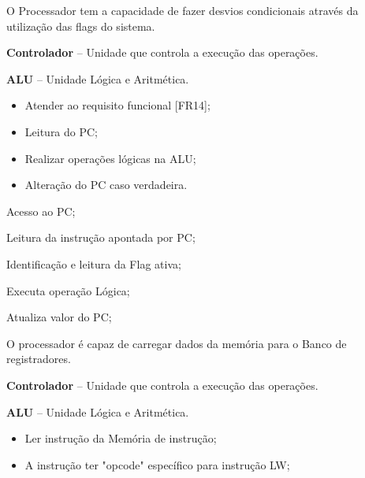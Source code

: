 \documentclass{article}
\begin{document}
  O Processador tem a capacidade de fazer desvios condicionais atrav\'{e}s da utilização das flags do sistema.
  \actors
    \begin{description}
     \item \textbf{Controlador} – Unidade que controla a execução das operações.
     \item \textbf{ALU} – Unidade L\'{o}gica e Aritm\'{e}tica.
    \end{description}
    
  \preconditions 
    \begin{itemize}
     \item Atender ao requisito funcional [FR14];
     \item Leitura do PC;
     \item Realizar operações lógicas na ALU;
    \end{itemize}

  \postconditions
    \begin{itemize}
     \item Alteração do PC caso verdadeira.
    \end{itemize}
  
  
  \begin{mainflow}
    \item Acesso ao PC;
    \item Leitura da instrução apontada por PC;
    \item Identificação e leitura da Flag ativa;
    \item Executa operação L\'{o}gica;
    \item Atualiza valor do PC;
  \end{mainflow}
  
  O processador é capaz de carregar dados da memória para o Banco de registradores.
  \actors
    \begin{description}
     \item \textbf{Controlador} – Unidade que controla a execução das operações.
     \item \textbf{ALU} – Unidade L\'{o}gica e Aritm\'{e}tica.
    \end{description}
    
  \preconditions 
    \begin{itemize}
     \item Ler instrução da Memória de instrução;
     \item A instrução ter "opcode" específico para instrução LW;
    \end{itemize}
\end{document}
